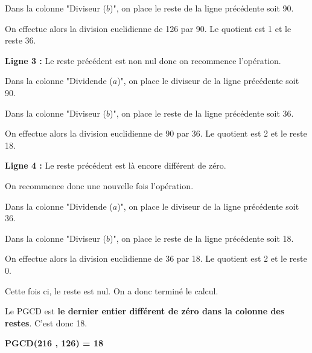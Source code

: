 \par
Dans la colonne "Diviseur ($b$)", on place le reste de la ligne précédente soit 90.
\par
On effectue alors la division euclidienne de 126 par 90. Le quotient est 1 et le reste 36.
\par
\textbf{Ligne 3 :} Le reste précédent est non nul donc on recommence l'opération.
\par
Dans la colonne "Dividende ($a$)", on place le diviseur de la ligne précédente soit 90.
\par
Dans la colonne "Diviseur ($b$)", on place le reste de la ligne précédente soit 36.
\par
On effectue alors la division euclidienne de 90 par 36. Le quotient est 2 et le reste 18.
\par
\textbf{Ligne 4 :} Le reste précédent est là encore différent de zéro.
\par
On recommence donc une nouvelle fois l'opération.
\par
Dans la colonne "Dividende ($a$)", on place le diviseur de la ligne précédente soit 36.
\par
Dans la colonne "Diviseur ($b$)", on place le reste de la ligne précédente soit 18.
\par
On effectue alors la division euclidienne de 36 par 18. Le quotient est 2 et le reste 0.
\par
Cette fois ci, le reste est nul. On a donc terminé le calcul.
\par
Le PGCD est \textbf{le dernier entier différent de zéro dans la colonne des restes}. C'est donc 18.
\begin{center}\textbf{PGCD(216 , 126) = 18}\end{center}
